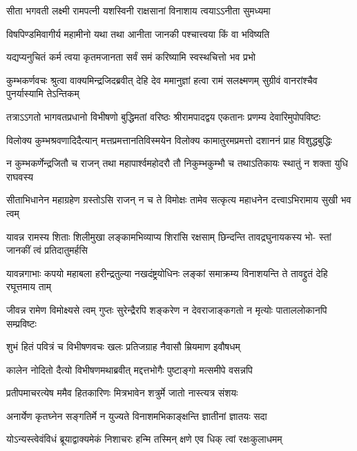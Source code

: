\twolineshloka
{सीता भगवती लक्ष्मी रामपत्नी यशस्विनी}
{राक्षसानां विनाशाय त्वयाऽऽनीता सुमध्यमा} %

\twolineshloka
{विषपिण्डमिवागीर्य महामीनो यथा तथा}
{आनीता जानकी पश्चात्त्वया किं वा भविष्यति} %

\twolineshloka
{यद्यप्यनुचितं कर्म त्वया कृतमजानता}
{सर्वं समं करिष्यामि स्वस्थचित्तो भव प्रभो} %

\threelineshloka
{कुम्भकर्णवचः श्रुत्वा वाक्यमिन्द्रजिदब्रवीत्}
{देहि देव ममानुज्ञां हत्वा रामं सलक्ष्मणम्}
{सुग्रीवं वानरांश्चैव पुनर्यास्यामि तेऽन्तिकम्} %

\fourlineindentedshloka
{तत्राऽऽगतो भागवतप्रधानो}
{विभीषणो बुद्धिमतां वरिष्ठः}
{श्रीरामपादद्वय एकतानः}
{प्रणम्य देवारिमुपोपविष्टः} %

\fourlineindentedshloka
{विलोक्य कुम्भश्रवणादिदैत्यान्}
{मत्तप्रमत्तानतिविस्मयेन}
{विलोक्य कामातुरमप्रमत्तो}
{दशाननं प्राह विशुद्धबुद्धिः} %

\fourlineindentedshloka
{न कुम्भकर्णेन्द्रजितौ च राजन्}
{तथा महापार्श्वमहोदरौ तौ}
{निकुम्भकुम्भौ च तथाऽतिकायः}
{स्थातुं न शक्ता युधि राघवस्य} %

\fourlineindentedshloka
{सीताभिधानेन महाग्रहेण}
{ग्रस्तोऽसि राजन् न च ते विमोक्षः}
{तामेव सत्कृत्य महाधनेन}
{दत्त्वाऽभिरामाय सुखी भव त्वम्} %

\fourlineindentedshloka
{यावन्न रामस्य शिताः शिलीमुखा}
{लङ्कामभिव्याप्य शिरांसि रक्षसाम्}
{छिन्दन्ति तावद्रघुनायकस्य भो-\-}
{स्तां जानकीं त्वं प्रतिदातुमर्हसि} %

\fourlineindentedshloka
{यावन्नगाभाः कपयो महाबला}
{हरीन्द्रतुल्या नखदंष्ट्रयोधिनः}
{लङ्कां समाक्रम्य विनाशयन्ति ते}
{तावद्द्रुतं देहि रघूत्तमाय ताम्} %

\fourlineindentedshloka
{जीवन्न रामेण विमोक्ष्यसे त्वम्}
{गुप्तः सुरेन्द्रैरपि शङ्करेण}
{न देवराजाङ्कगतो न मृत्योः}
{पाताललोकानपि सम्प्रविष्टः} %

\twolineshloka
{शुभं हितं पवित्रं च विभीषणवचः खलः}
{प्रतिजग्राह नैवासौ म्रियमाण इवौषधम्} %

\twolineshloka
{कालेन नोदितो दैत्यो विभीषणमथाब्रवीत्}
{मद्दत्तभोगैः पुष्टाङ्गो मत्समीपे वसन्नपि} %

\twolineshloka
{प्रतीपमाचरत्येष ममैव हितकारिणः}
{मित्रभावेन शत्रुर्मे जातो नास्त्यत्र संशयः} %

\twolineshloka
{अनार्येण कृतघ्नेन सङ्गतिर्मे न युज्यते}
{विनाशमभिकाङ्क्षन्ति ज्ञातीनां ज्ञातयः सदा} %

\twolineshloka
{योऽन्यस्त्वेवंविधं ब्रूयाद्वाक्यमेकं निशाचरः}
{हन्मि तस्मिन् क्षणे एव धिक् त्वां रक्षःकुलाधमम्} %

